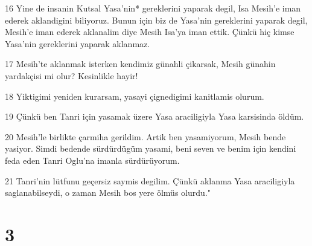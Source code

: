 \par 16 Yine de insanin Kutsal Yasa'nin* gereklerini yaparak degil, Isa Mesih'e iman ederek aklandigini biliyoruz. Bunun için biz de Yasa'nin gereklerini yaparak degil, Mesih'e iman ederek aklanalim diye Mesih Isa'ya iman ettik. Çünkü hiç kimse Yasa'nin gereklerini yaparak aklanmaz.
\par 17 Mesih'te aklanmak isterken kendimiz günahli çikarsak, Mesih günahin yardakçisi mi olur? Kesinlikle hayir!
\par 18 Yiktigimi yeniden kurarsam, yasayi çignedigimi kanitlamis olurum.
\par 19 Çünkü ben Tanri için yasamak üzere Yasa araciligiyla Yasa karsisinda öldüm.
\par 20 Mesih'le birlikte çarmiha gerildim. Artik ben yasamiyorum, Mesih bende yasiyor. Simdi bedende sürdürdügüm yasami, beni seven ve benim için kendini feda eden Tanri Oglu'na imanla sürdürüyorum.
\par 21 Tanri'nin lütfunu geçersiz saymis degilim. Çünkü aklanma Yasa araciligiyla saglanabilseydi, o zaman Mesih bos yere ölmüs olurdu."

\chapter{3}


